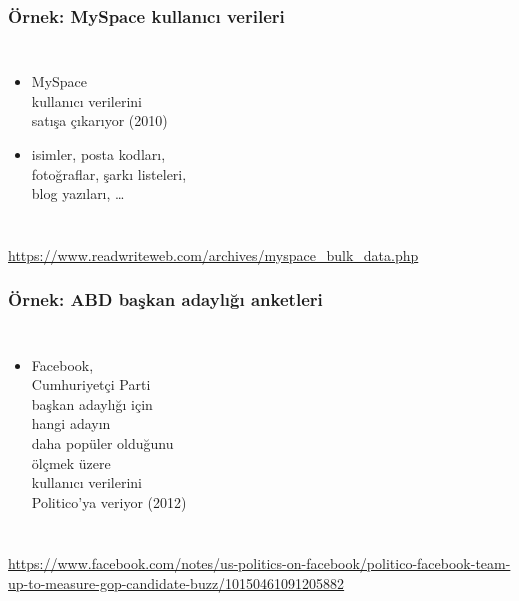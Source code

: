 \documentclass[dvipsnames]{beamer}
\theoremstyle{definition}
\theoremstyle{example}
\theoremstyle{plain}
\begin{document}
\begin{frame}
  \frametitle{Örnek: MySpace kullanıcı verileri}

  \begin{columns}

    \begin{itemize}
      \item MySpace\\
        kullanıcı verilerini\\
        satışa çıkarıyor (2010)
      \item isimler, posta kodları,\\
        fotoğraflar, şarkı listeleri,\\
        blog yazıları, \ldots
    \end{itemize}
  \end{columns}

  \medskip
  \tiny{\url{https://www.readwriteweb.com/archives/myspace_bulk_data.php}}\\
\end{frame}

\begin{frame}
  \frametitle{Örnek: ABD başkan adaylığı anketleri}

  \begin{columns}

    \begin{itemize}
      \item Facebook,\\
        Cumhuriyetçi Parti\\
        başkan adaylığı için\\
        hangi adayın\\
        daha popüler olduğunu\\
        ölçmek üzere\\
        kullanıcı verilerini\\
        Politico'ya veriyor (2012)
    \end{itemize}
  \end{columns}

  \medskip
  \tiny{\url{https://www.facebook.com/notes/us-politics-on-facebook/politico-facebook-team-up-to-measure-gop-candidate-buzz/10150461091205882}}\\
\end{frame}
\end{document}
